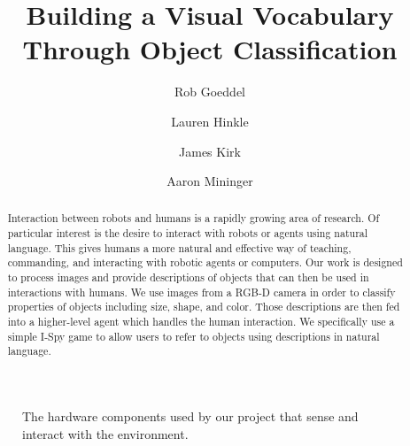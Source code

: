 \documentclass[11pt]{article}
\title{Building a Visual Vocabulary Through Object Classification}
\author{Rob Goeddel \and Lauren Hinkle \and James Kirk \and Aaron Mininger}
\date{}
\begin{document}
\maketitle

\begin{abstract}
Interaction between robots and humans is a rapidly growing area of research. Of particular interest is the desire to interact with robots or agents using natural language. This gives humans a more natural and effective way of teaching, commanding, and interacting with robotic agents or computers. Our work is designed to process images and provide descriptions of objects that can then be used in interactions with humans. We use images from a RGB-D camera in order to classify properties of objects including size, shape, and color. Those descriptions are then fed into a higher-level agent which handles the human interaction. We specifically use a simple I-Spy game to allow users to refer to objects using descriptions in natural language.
\end{abstract}

\begin{figure}
\centering
{}
\caption{The hardware components used by our project that sense and interact with the environment.}
\label{fig:hardware}
\end{figure}
\end{document}
